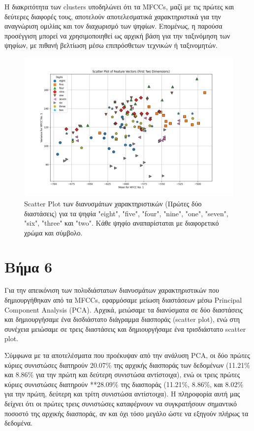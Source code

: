\documentclass[a4paper,12pt]{article}
\begin{document}
Η διακριτότητα των clusters υποδηλώνει ότι τα MFCCs, μαζί με τις πρώτες και δεύτερες διαφορές τους,
αποτελούν αποτελεσματικά χαρακτηριστικά για την αναγνώριση ομιλίας και τον διαχωρισμό των ψηφίων. Επομένως,
η παρούσα προσέγγιση μπορεί να χρησιμοποιηθεί ως αρχική βάση για την ταξινόμηση των ψηφίων,
με πιθανή βελτίωση μέσω επιπρόσθετων τεχνικών ή ταξινομητών.

\begin{figure}[h]
    \centering
    \includegraphics[width=\textwidth]{images/feature_vectors_scatterplot.png}
    \caption{Scatter Plot των διανυσμάτων χαρακτηριστικών (Πρώτες δύο διαστάσεις) για τα ψηφία "eight", "five", "four", "nine", "one", "seven", "six", "three" και "two". Κάθε ψηφίο αναπαρίσταται με διαφορετικό χρώμα και σύμβολο.}
    \label{fig:scatter_plot_feature_vectors}
\end{figure}

\section*{Βήμα 6}

Για την απεικόνιση των πολυδιάστατων διανυσμάτων χαρακτηριστικών που δημιουργήθηκαν από τα MFCCs, εφαρμόσαμε μείωση διαστάσεων μέσω Principal Component Analysis (PCA). Αρχικά, μειώσαμε τα διανύσματα σε δύο διαστάσεις και δημιουργήσαμε ένα δισδιάστατο διάγραμμα διασποράς (scatter plot), ενώ στη συνέχεια μειώσαμε σε τρεις διαστάσεις και δημιουργήσαμε ένα τρισδιάστατο scatter plot.

Σύμφωνα με τα αποτελέσματα που προέκυψαν από την ανάλυση PCA,
οι δύο πρώτες κύριες συνιστώσες διατηρούν 20.07\%
της αρχικής διασποράς των δεδομένων (11.21\% και 8.86\% για την πρώτη και δεύτερη συνιστώσα αντίστοιχα),
ενώ οι τρεις πρώτες κύριες συνιστώσες διατηρούν **28.09\% της διασποράς (11.21\%, 8.86\%, και 8.02\% για
την πρώτη, δεύτερη και τρίτη συνιστώσα αντίστοιχα). Η πληροφορία αυτή μας δείχνει ότι οι πρώτες τρεις
συνιστώσες καταφέρνουν να συγκρατήσουν σημαντικό ποσοστό της αρχικής διασποράς, αν και όχι τόσο μεγάλο ώστε να εξηγούν πλήρως τα δεδομένα.
\end{document}
